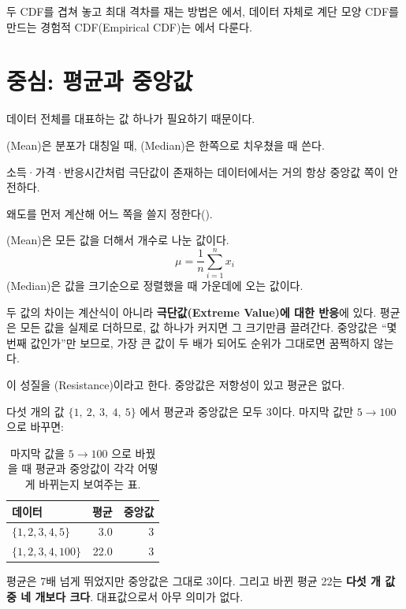 두 CDF를 겹쳐 놓고 최대 격차를 재는 방법은 에서, 데이터
자체로 계단 모양 CDF를 만드는 경험적 CDF(Empirical CDF)는
에서 다룬다.

\section{중심: 평균과 중앙값}
\label{sec:center}

\begin{inbrief}
  \item[Why] 데이터 전체를 대표하는 값 하나가 필요하기 때문이다.
  \item[When] (Mean)은 분포가 대칭일 때, (Median)은
              한쪽으로 치우쳤을 때 쓴다.
  \item[Where] 소득·가격·반응시간처럼 극단값이 존재하는 데이터에서는 거의 항상
               중앙값 쪽이 안전하다.
  \item[How] 왜도를 먼저 계산해 어느 쪽을 쓸지 정한다().
\end{inbrief}

\begin{definition}[중심의 두 정의]
\label{def:center}
(Mean)은 모든 값을 더해서 개수로 나눈 값이다.
\[
  \mu = \frac{1}{n}\sum_{i=1}^{n} x_i
\]
(Median)은 값을 크기순으로 정렬했을 때 가운데에 오는 값이다.
\end{definition}

두 값의 차이는 계산식이 아니라 \textbf{극단값(Extreme Value)에 대한 반응}에
있다. 평균은 모든 값을 실제로 더하므로, 값 하나가 커지면 그 크기만큼 끌려간다.
중앙값은 ``몇 번째 값인가''만 보므로, 가장 큰 값이 두 배가 되어도 순위가 그대로면
꿈쩍하지 않는다.

이 성질을 (Resistance)이라고 한다. 중앙값은 저항성이 있고 평균은
없다.

\begin{example}
\label{ex:resistance}
다섯 개의 값 $\{1,\ 2,\ 3,\ 4,\ 5\}$ 에서 평균과 중앙값은 모두 3이다.
마지막 값만 $5 \to 100$ 으로 바꾸면:

\begin{table}[H]\centering
\caption{마지막 값을 $5 \to 100$ 으로 바꿨을 때 평균과 중앙값이 각각
어떻게 바뀌는지 보여주는 표.}
\label{tab:desc-resistance-mean-median}
\begin{tabular}{lrr}
\toprule
데이터 & 평균 & 중앙값 \\
\midrule
$\{1,2,3,4,5\}$   & 3.0  & 3 \\
\midrule
$\{1,2,3,4,100\}$ & 22.0 & 3 \\
\bottomrule
\end{tabular}
\end{table}

평균은 7배 넘게 뛰었지만 중앙값은 그대로 3이다. 그리고 바뀐 평균 22는
\textbf{다섯 개 값 중 네 개보다 크다}. 대표값으로서 아무 의미가 없다.
\end{example}

